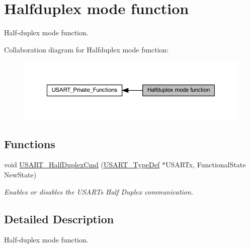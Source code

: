 \hypertarget{group___u_s_a_r_t___group5}{}\section{Halfduplex mode function}
\label{group___u_s_a_r_t___group5}


Half-\/duplex mode function.  


Collaboration diagram for Halfduplex mode function\+:
\nopagebreak
\begin{figure}[H]
\begin{center}
\leavevmode
\includegraphics[width=350pt]{group___u_s_a_r_t___group5}
\end{center}
\end{figure}
\subsection*{Functions}
\begin{DoxyCompactItemize}
\item 
void \hyperlink{group___u_s_a_r_t___group5_gaaa23b05fe0e1896bad90da7f82750831}{U\+S\+A\+R\+T\+\_\+\+Half\+Duplex\+Cmd} (\hyperlink{struct_u_s_a_r_t___type_def}{U\+S\+A\+R\+T\+\_\+\+Type\+Def} $\ast$U\+S\+A\+R\+Tx, Functional\+State New\+State)
\begin{DoxyCompactList}\small\item\em Enables or disables the U\+S\+A\+RT\textquotesingle{}s Half Duplex communication. \end{DoxyCompactList}\end{DoxyCompactItemize}


\subsection{Detailed Description}
Half-\/duplex mode function. 

